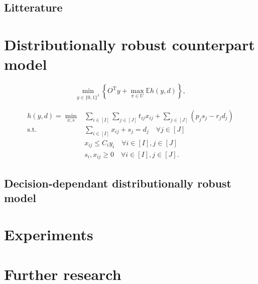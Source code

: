 \documentclass[12pt, letterpaper]{article}
\newcommand{\R}{\mathbb{R}}
\newcommand{\T}{\mathrm{T}}
\newcommand{\E}{\mathbb{E}}
\newcommand{\Dcal}{\mathcal{D}}
\begin{document}
	
	\subsection*{Litterature}
	
	\section{Distributionally robust counterpart model}
	\begin{equation}\label{eq:dro_outterproblem}
		\min_{y \in \{0, 1\}^I} \left\{O^\T y + \max_{\pi \in U} \E h(y, d)\right\},
	\end{equation}
	
	\begin{subequations}
		\begin{align} \label{eq:dro_innerproblem}
			h(y, d) = \min_{x, s} &\sum_{i \in [I]} \sum_{j \in [J]} t_{ij}x_{ij} + \sum_{j \in [J]} (p_j s_j - r_j d_j) \\
			\text{s.t.} &\sum_{i \in [I]} x_{ij} + s_j = d_j \quad \forall j \in [J] \\
			&x_{ij} \le C_i y_i \quad \forall i \in [I], j \in [J] \\
			&s_i, x_{ij} \ge 0 \quad \forall i \in [I], j \in [J].
		\end{align}
	\end{subequations}
	
	\subsection{Decision-dependant distributionally robust model}
	
	\section{Experiments}
	
	\section{Further research}
	
	
	
\end{document}
